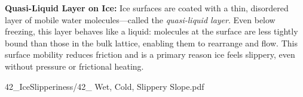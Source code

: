 \begin{SideNotePage}{
  \textbf{Quasi-Liquid Layer on Ice:}  
  Ice surfaces are coated with a thin, disordered layer of mobile water molecules—called the \emph{quasi-liquid layer}. Even below freezing, this layer behaves like a liquid: molecules at the surface are less tightly bound than those in the bulk lattice, enabling them to rearrange and flow. This surface mobility reduces friction and is a primary reason ice feels slippery, even without pressure or frictional heating. \par
}{42_IceSlipperiness/42_ Wet, Cold, Slippery Slope.pdf}
\end{SideNotePage}
